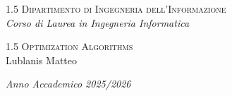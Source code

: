 \documentclass[12pt,a4paper,hidelinks]{article}
\begin{document}
	
	\begin{titlepage}
		\begin{center}
			\begin{spacing}{1.5}
				{\Large \textsc{Dipartimento di Ingegneria dell'Informazione}}\\
				{\large \it Corso di Laurea in Ingegneria Informatica}
			\end{spacing}
		\end{center}
		
		\vspace{15mm}
		
		\begin{center}
			\begin{spacing}{1.5}
				{\LARGE \textsc{Optimization Algorithms}}\\
				Lublanis Matteo
			\end{spacing}
		\end{center}
		
		\vspace{35mm}
		
		\noindent
		
		\vspace{25mm}
		
		\begin{center}
			{\large \it Anno Accademico 2025/2026}
		\end{center}
	\end{titlepage}
	
	
	\tableofcontents
	\newpage
	
	
	\newpage
	
	
	\newpage
	
	
	\newpage
	
	
	\newpage

	
	\newpage
	
	
	\newpage
	
	
	\newpage
	
	
	\newpage
	
	
	\newpage
	
	
	\newpage
	
	
\end{document}
